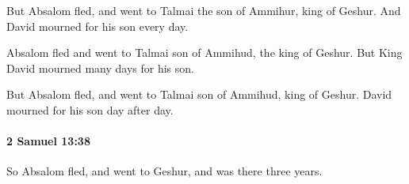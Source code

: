 			\begin{versebox}
					\item[BHS] 
					\item[ASV] But Absalom fled, and went to Talmai the son of Ammihur, king of Geshur. And David mourned for his son every day.
					\item[NIV] Absalom fled and went to Talmai son of Ammihud, the king of Geshur. But King David mourned many days for his son.
					\item[NRSV] But Absalom fled, and went to Talmai son of Ammihud, king of Geshur. David mourned for his son day after day.
			\end{versebox}

		\paragraph{2 Samuel 13:38} %
			\label{2SAMUEL-13-38}

			So Absalom fled, and went to Geshur, and was there three years.

